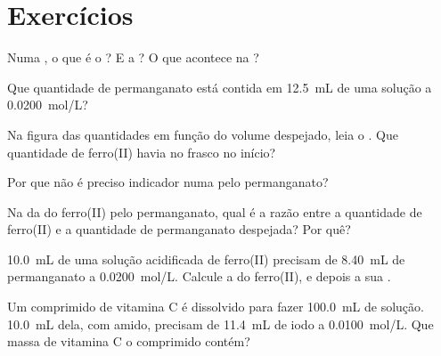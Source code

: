 \section{Exercícios}


\begin{exercise}[$\star$]\label{exo:g11:titration:1}
Numa , o que é o ? E a ? O que
acontece na ?
\end{exercise}

\begin{exercise}[$\star$]\label{exo:g11:titration:2}
Que quantidade de  permanganato está contida em \qty{12.5}{mL} de
uma solução a \qty{0.0200}{mol/L}?
\end{exercise}

\begin{exercise}[$\star$]\label{exo:g11:titration:3}
Na figura das quantidades em função do volume despejado, leia o . Que quantidade de ferro(II) havia no frasco no início?
\end{exercise}

\begin{exercise}[$\star$]\label{exo:g11:titration:4}
Por que não é preciso indicador numa  pelo permanganato?
\end{exercise}

\begin{exercise}[$\star$]\label{exo:g11:titration:5}
Na  da  do ferro(II) pelo permanganato, qual é a
razão entre a quantidade de ferro(II) e a quantidade de permanganato
despejada? Por quê?
\end{exercise}

\begin{exercise}[$\star\star$]\label{exo:g11:titration:6}
\qty{10.0}{mL} de uma solução acidificada de ferro(II) precisam de
\qty{8.40}{mL} de permanganato a \qty{0.0200}{mol/L}. Calcule a
 do ferro(II), e depois a sua .
\end{exercise}

\begin{exercise}[$\star\star$]\label{exo:g11:titration:7}
Um comprimido de vitamina C é dissolvido para fazer \qty{100.0}{mL} de
solução. \qty{10.0}{mL} dela, com amido, precisam de \qty{11.4}{mL} de
iodo a \qty{0.0100}{mol/L}. Que massa de vitamina C o comprimido
contém?
\end{exercise}

